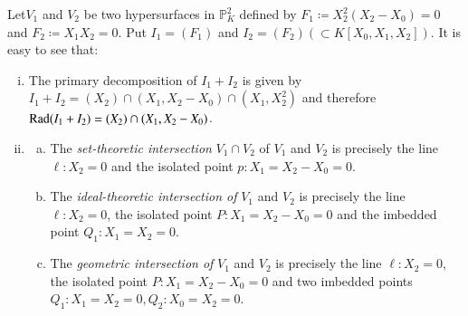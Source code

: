 \begin{example}
  Let\pageoriginale $V_1$ and $V_2$ be two hypersurfaces in
  $\mathbb{P}^2_K$ defined 
  by $F_1 \coloneqq X^2_2(X_2-X_0) = 0 $ and $F_2 \coloneqq X_1X_2 =
  0$. Put $I_1 = (F_1)$ and $I_2=(F_2)(\subset K[X_0,X_1,X_2])$. It is
  easy to see that: 
\begin{enumerate}[(i)] 
\item The primary decomposition of $I_1+I_2$ is given by $I_1 + I_2 =
  (X_2) \cap (X_1,X_2-X_0) \cap (X_1, X^2_2)$ and therefore $\operatorname{Rad} (I_1+I_2)
  = (X_2) \cap (X_1,X_2-X_0)$. 
\item 
  \begin{enumerate}[(a)]
    \item The \textit{set-theoretic intersection} $V_1 \cap V_2$ of
      $V_1$ and $V_2$ is precisely the line $\ell: X_2 = 0$ and the isolated
      point $p:  X_1 = X_2 - X_0 = 0$. 
    \item The \textit{ideal-theoretic intersection of} $V_1$ and $V_2$
      is precisely the line $\ell:  X_2 = 0$, the isolated point $P:
      X_1 = X_2 - X_0 = 0$ and the imbedded point $Q_1:  X_1 = X_2 =
      0$. 
    \item The \textit{geometric intersection of } $V_1$ and $V_2$ is
      precisely the line $\ell:  X_2 = 0$, the isolated point $P:  X_1
      = X_2 - X_0 = 0$ and two imbedded points $Q_1:  X_1 = X_2 = 0,
      Q_2:  X_0 = X_2 = 0$. 


\end{enumerate}
\end{enumerate}
\end{example}
